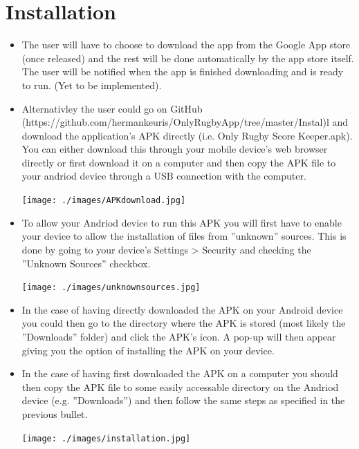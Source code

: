 \documentclass[hidelinks,a4paper,12pt]{article}
\begin{document}
\section{Installation}
\begin {itemize}
	\item The user will have to choose to download the app from the Google App store (once released) and the rest will be done automatically by the app store itself. The user will be notified when the app is finished downloading and is ready to run. (Yet to be implemented).
	\item Alternativley the user could go on GitHub (https://github.com/hermankeuris/OnlyRugbyApp/tree/master/Instal)l and download the application's APK directly (i.e. Only Rugby Score Keeper.apk). You can either download this through your mobile device's web browser directly or first download it on a computer and then copy the APK file to your andriod device through a USB connection with the computer.
	\begin{center}
  		 \texttt{[image: ./images/APKdownload.jpg]}\\[0.4cm]
	\end{center}
	\item To allow your Andriod device to run this APK you will first have to enable your device to allow the installation of files from ''unknown'' sources. This is done by going to your device's Settings > Security and checking the ''Unknown Sources'' checkbox.
	\begin{center}
  		 \texttt{[image: ./images/unknownsources.jpg]}\\[0.4cm]
	\end{center}
	\item In the case of having directly downloaded the APK on your Android device you could then go to the directory where the APK is stored (most likely the ''Downloads'' folder) and click the APK's icon. A pop-up will then appear giving you the option of installing the APK on your device.
	\item In the case of having first downloaded the APK on a computer you should then copy the APK file to some easily accessable directory on the Andriod device (e.g. ''Downloads'') and then follow the same steps as specified in the previous bullet.
	\begin{center}
  		 \texttt{[image: ./images/installation.jpg]}\\[0.4cm]
	\end{center}
\end{itemize}
\end{document}

